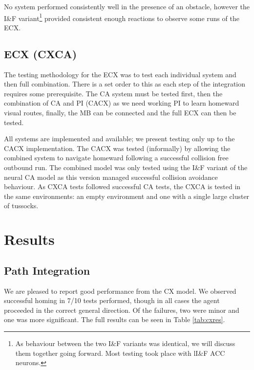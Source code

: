 \documentclass[a4paper,11pt,twoside,openright]{article}
\let\oldsection\section
\def\section{\cleardoublepage\oldsection}
\begin{document}
No system performed consistently well in the presence of an obstacle,
however the I\&F variant\footnote{As behaviour between the two I\&F
  variants was identical, we will discuss them together going
  forward. Most testing took place with lI\&F ACC neurons.} provided
consistent enough reactions to observe some runs of the ECX.

\subsection{ECX (CXCA)}
The testing methodology for the ECX was to test each individual system
and then full combination. There is a set order to this as each step
of the integration requires some prerequisite. The CA system must be
tested first, then the combination of CA and PI (CACX) as we need
working PI to learn homeward visual routes, finally, the MB can be
connected and the full ECX can then be tested.
\newline\par

All systems are implemented and available; we present testing only up
to the CACX implementation. The CACX was tested (informally) by
allowing the combined system to navigate homeward following a
successful collision free outbound run. The combined model was
only tested using the I\&F variant of the neural CA model as this
version managed successful collision avoidance behaviour. As CXCA
tests followed successful CA tests, the CXCA is tested in the same
environments: an empty environment and one with a single large
cluster of tussocks.


\section{ Results } \label{sec:results}
\subsection{ Path Integration }
We are pleased to report good performance from the CX model. We
observed successful homing in 7/10 tests performed, though in all
cases the agent proceeded in the correct general direction. Of the
failures, two were minor and one was more significant. The full
results can be seen in Table \ref{tab:cxres}.
\newline
\par
\end{document}
